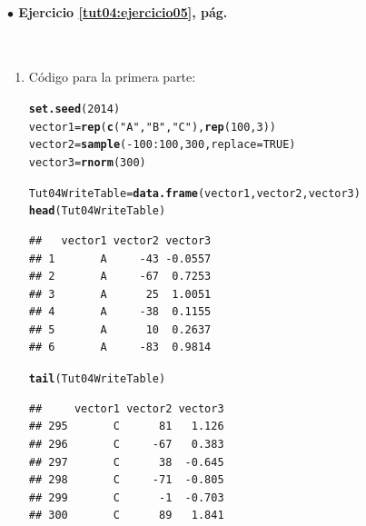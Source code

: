 \documentclass[10pt,a4paper]{article}\usepackage[]{graphicx}\usepackage[]{color}
\makeatletter
\newcommand{\hlnum}[1]{\textcolor[rgb]{0.686,0.059,0.569}{#1}}%
\newcommand{\hlstr}[1]{\textcolor[rgb]{0.192,0.494,0.8}{#1}}%
\newcommand{\hlopt}[1]{\textcolor[rgb]{0,0,0}{#1}}%
\newcommand{\hlstd}[1]{\textcolor[rgb]{0.345,0.345,0.345}{#1}}%
\newcommand{\hlkwb}[1]{\textcolor[rgb]{0.69,0.353,0.396}{#1}}%
\newcommand{\hlkwc}[1]{\textcolor[rgb]{0.333,0.667,0.333}{#1}}%
\newcommand{\hlkwd}[1]{\textcolor[rgb]{0.737,0.353,0.396}{\textbf{#1}}}%
\newenvironment{kframe}{%
 \def\at@end@of@kframe{}%
 \ifinner\ifhmode%
  \def\at@end@of@kframe{\end{minipage}}%
  \begin{minipage}{\columnwidth}%
 \fi\fi%
 \def\FrameCommand##1{\hskip\@totalleftmargin \hskip-\fboxsep
 \colorbox{shadecolor}{##1}\hskip-\fboxsep
     \hskip-\linewidth \hskip-\@totalleftmargin \hskip\columnwidth}%
 \MakeFramed {\advance\hsize-\width
   \@totalleftmargin\z@ \linewidth\hsize
   \@setminipage}}%
 {\par\unskip\endMakeFramed%
 \at@end@of@kframe}
\newenvironment{knitrout}{}{} %
\makeatother
\begin{document}
\paragraph{\bf $\bullet$ Ejercicio \ref{tut04:ejercicio05}, pág. \pageref{tut04:ejercicio05}}
\label{tut04:ejercicio05:sol}\quad\\
\begin{enumerate}
  \item
  Código para la primera parte:
\begin{knitrout}
\color{fgcolor}\begin{kframe}
\begin{alltt}
\hlkwd{set.seed}\hlstd{(}\hlnum{2014}\hlstd{)}
\hlstd{vector1} \hlkwb{=} \hlkwd{rep}\hlstd{(}\hlkwd{c}\hlstd{(}\hlstr{"A"}\hlstd{,} \hlstr{"B"}\hlstd{,} \hlstr{"C"}\hlstd{),} \hlkwd{rep}\hlstd{(}\hlnum{100}\hlstd{,} \hlnum{3}\hlstd{))}
\hlstd{vector2} \hlkwb{=} \hlkwd{sample}\hlstd{(}\hlopt{-}\hlnum{100}\hlopt{:}\hlnum{100}\hlstd{,} \hlnum{300}\hlstd{,} \hlkwc{replace}\hlstd{=}\hlnum{TRUE}\hlstd{)}
\hlstd{vector3} \hlkwb{=} \hlkwd{rnorm}\hlstd{(}\hlnum{300}\hlstd{)}

\hlstd{Tut04WriteTable} \hlkwb{=} \hlkwd{data.frame}\hlstd{(vector1, vector2, vector3)}
\hlkwd{head}\hlstd{(Tut04WriteTable)}
\end{alltt}
\begin{verbatim}
##   vector1 vector2 vector3
## 1       A     -43 -0.0557
## 2       A     -67  0.7253
## 3       A      25  1.0051
## 4       A     -38  0.1155
## 5       A      10  0.2637
## 6       A     -83  0.9814
\end{verbatim}
\begin{alltt}
\hlkwd{tail}\hlstd{(Tut04WriteTable)}
\end{alltt}
\begin{verbatim}
##     vector1 vector2 vector3
## 295       C      81   1.126
## 296       C     -67   0.383
## 297       C      38  -0.645
## 298       C     -71  -0.805
## 299       C      -1  -0.703
## 300       C      89   1.841
\end{verbatim}
\end{kframe}
\end{knitrout}


\end{enumerate}
\end{document}

